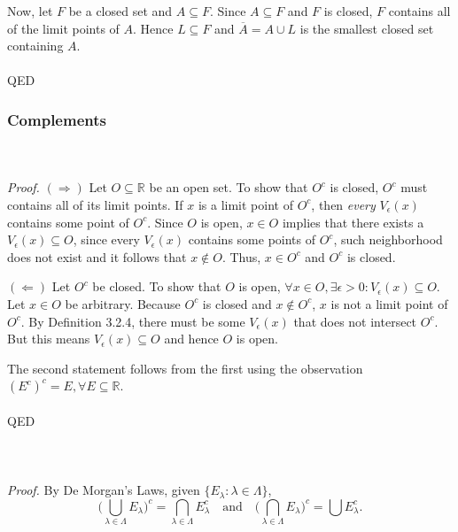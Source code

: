\documentclass{article}
\begin{document}
            Now, let $F$ be a closed set and $A \subseteq F$. Since $A \subseteq F$ and $F$ is closed, $F$ contains all of the limit points of $A$. Hence $L \subseteq F$ and $\overline{A} = A \cup L$ is the smallest closed set containing $A$. 
            \\ \\
            QED
            
            \subsubsection{Complements}
            \\ \\
            \textit{Proof.} $(\Rightarrow)$ Let $O \subseteq \mathbb{R}$ be an open set. To show that $O^c$ is closed, $O^c$ must contains all of its limit points. If $x$ is a limit point of $O^c$, then \textit{every} $V_\epsilon(x)$ contains some point of $O^c$. Since $O$ is open, $x \in O$ implies that there exists a $V_\epsilon(x) \subseteq O$, since every $V_\epsilon(x)$ contains some points of $O^c$, such neighborhood does not exist and it follows that $x \notin O$. Thus, $x \in O^c$ and $O^c$ is closed.
            
            $(\Leftarrow)$ Let $O^c$ be closed. To show that $O$ is open, $\forall x \in O, \exists \epsilon > 0: V_\epsilon(x) \subseteq O$. Let $x \in O$ be arbitrary. Because $O^c$ is closed and $x \notin O^c$, $x$ is not a limit point of $O^c$. By Definition 3.2.4, there must be some $V_\epsilon(x)$ that does not intersect $O^c$. But this means $V_\epsilon(x) \subseteq O$ and hence $O$ is open.
            
            The second statement follows from the first using the observation $(E^c)^c=E,\forall E \subseteq \mathbb{R}$.\\ \\
            QED
            \\ \\
            \\ \\
            \textit{Proof.} By De Morgan's Laws, given $\{E_\lambda : \lambda \in \Lambda\}$,
            \begin{equation*}
                \Bigg(\bigcup_{\lambda \in \Lambda} E_\lambda \Bigg)^c = \bigcap_{\lambda \in \Lambda} E^c_\lambda \quad \text{and} \quad \Bigg(\bigcap_{\lambda \in \Lambda} E_\lambda \Bigg)^c = \bigcup E^c_\lambda.
            \end{equation*}
            
\end{document}
